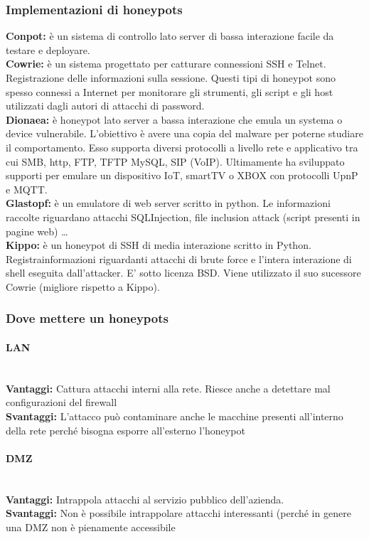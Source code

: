 \documentclass[8pt]{extarticle}
\begin{document}
\subsubsection{Implementazioni di honeypots}
\textbf{Conpot:} è un sistema di controllo lato server di bassa interazione facile da testare e deployare.\\
\textbf{Cowrie:} è un sistema progettato per catturare connessioni SSH e Telnet. Registrazione delle informazioni 
sulla sessione. Questi tipi di honeypot sono spesso connessi a Internet per monitorare gli strumenti, gli script e 
gli host utilizzati dagli autori di attacchi di password.\\
\textbf{Dionaea:} è honeypot lato server a bassa interazione che emula un systema o device vulnerabile. 
L’obiettivo è avere una copia del malware per poterne studiare il comportamento. Esso supporta diversi 
protocolli a livello rete e applicativo tra cui SMB, http, FTP, TFTP MySQL, SIP (VoIP). Ultimamente ha 
sviluppato supporti per emulare un dispositivo IoT, smartTV o XBOX con protocolli UpnP e MQTT.\\
\textbf{Glastopf:} è un emulatore di web server scritto in python. Le informazioni raccolte riguardano attacchi 
SQLInjection, file inclusion attack (script presenti in pagine web) \dots \\
\textbf{Kippo:} è un honeypot di SSH di media interazione scritto in Python. Registrainformazioni riguardanti 
attacchi di brute force e l’intera interazione di shell eseguita dall’attacker. E’ sotto licenza BSD. 
Viene utilizzato il suo sucessore Cowrie (migliore rispetto a Kippo).
\subsubsection{Dove mettere un honeypots}
\paragraph{LAN}
\noindent
\\
\textbf{Vantaggi:} Cattura attacchi interni alla rete. Riesce anche a detettare mal configurazioni del firewall \\
\textbf{Svantaggi:} L’attacco può contaminare anche le macchine presenti all’interno della rete perché bisogna 
esporre all’esterno l’honeypot 
\paragraph{DMZ}
\noindent
\\
\textbf{Vantaggi:} Intrappola attacchi al servizio pubblico dell’azienda.\\
\textbf{Svantaggi:} Non è possibile intrappolare attacchi interessanti (perché in genere una DMZ non è pienamente accessibile 
\end{document}
